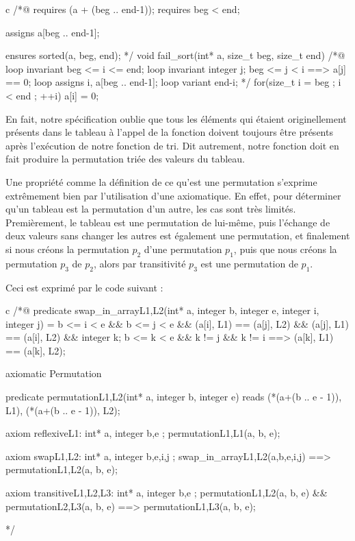 \begin{CodeBlock}{c}
/*@
  requires \valid(a + (beg .. end-1));
  requires beg < end;

  assigns  a[beg .. end-1];
  
  ensures sorted(a, beg, end);
*/
void fail_sort(int* a, size_t beg, size_t end){
  /*@
    loop invariant beg <= i <= end;
    loop invariant \forall integer j; beg <= j < i ==> a[j] == 0;
    loop assigns i, a[beg .. end-1];
    loop variant end-i;
  */
  for(size_t i = beg ; i < end ; ++i)
    a[i] = 0;
}
\end{CodeBlock}



En fait, notre spécification oublie que tous les éléments qui étaient 
originellement présents dans le tableau à l'appel de la fonction doivent
toujours être présents après l'exécution de notre fonction de tri. Dit
autrement, notre fonction doit en fait produire la permutation triée des
valeurs du tableau.



Une propriété comme la définition de ce qu'est une permutation s'exprime 
extrêmement bien par l'utilisation d'une axiomatique. En effet, pour déterminer
qu'un tableau est la permutation d'un autre, les cas sont très limités. 
Premièrement, le tableau est une permutation de lui-même, puis l'échange de
deux valeurs sans changer les autres est également une permutation, et 
finalement si nous créons la permutation $p_2$ d'une permutation $p_1$, puis que 
nous créons la permutation $p_3$ de $p_2$, alors par transitivité $p_3$ est une
permutation de $p_1$.



Ceci est exprimé par le code suivant :



\begin{CodeBlock}{c}
/*@
  predicate swap_in_array{L1,L2}(int* a, integer b, integer e, integer i, integer j) =
    b <= i < e && b <= j < e &&
    \at(a[i], L1) == \at(a[j], L2) && \at(a[j], L1) == \at(a[i], L2) &&
    \forall integer k; b <= k < e && k != j && k != i ==> \at(a[k], L1) == \at(a[k], L2);

  axiomatic Permutation{
    predicate permutation{L1,L2}(int* a, integer b, integer e)
     reads \at(*(a+(b .. e - 1)), L1), \at(*(a+(b .. e - 1)), L2);

    axiom reflexive{L1}: 
      \forall int* a, integer b,e ; permutation{L1,L1}(a, b, e);

    axiom swap{L1,L2}:
      \forall int* a, integer b,e,i,j ;
        swap_in_array{L1,L2}(a,b,e,i,j) ==> permutation{L1,L2}(a, b, e);
	
    axiom transitive{L1,L2,L3}:
      \forall int* a, integer b,e ; 
        permutation{L1,L2}(a, b, e) && permutation{L2,L3}(a, b, e) ==> permutation{L1,L3}(a, b, e);
  }
*/
\end{CodeBlock}



